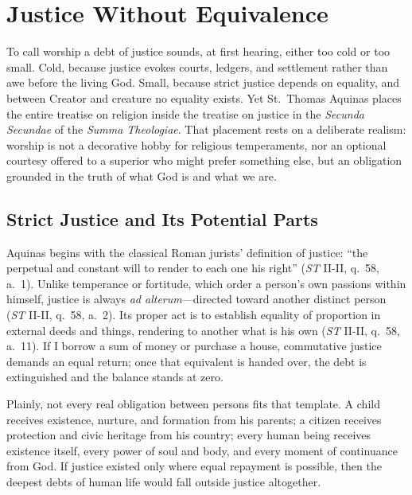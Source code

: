 \section{Justice Without Equivalence}

To call worship a debt of justice sounds, at first hearing, either too cold or too small. Cold, because justice evokes courts, ledgers, and settlement rather than awe before the living God. Small, because strict justice depends on equality, and between Creator and creature no equality exists. Yet St.\ Thomas Aquinas places the entire treatise on religion inside the treatise on justice in the \emph{Secunda Secundae} of the \emph{Summa Theologiae}. That placement rests on a deliberate realism: worship is not a decorative hobby for religious temperaments, nor an optional courtesy offered to a superior who might prefer something else, but an obligation grounded in the truth of what God is and what we are.

\subsection{Strict Justice and Its Potential Parts}

Aquinas begins with the classical Roman jurists' definition of justice: ``the perpetual and constant will to render to each one his right'' (\emph{ST} II-II, q.\ 58, a.\ 1). Unlike temperance or fortitude, which order a person's own passions within himself, justice is always \emph{ad alterum}---directed toward another distinct person (\emph{ST} II-II, q.\ 58, a.\ 2). Its proper act is to establish equality of proportion in external deeds and things, rendering to another what is his own (\emph{ST} II-II, q.\ 58, a.\ 11). If I borrow a sum of money or purchase a house, commutative justice demands an equal return; once that equivalent is handed over, the debt is extinguished and the balance stands at zero.

Plainly, not every real obligation between persons fits that template. A child receives existence, nurture, and formation from his parents; a citizen receives protection and civic heritage from his country; every human being receives existence itself, every power of soul and body, and every moment of continuance from God. If justice existed only where equal repayment is possible, then the deepest debts of human life would fall outside justice altogether.

